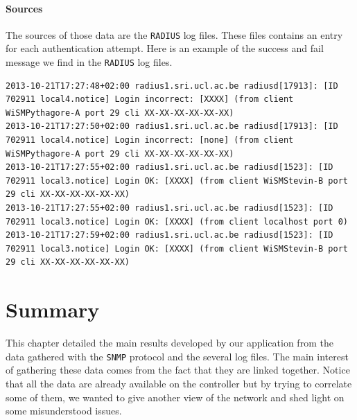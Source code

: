 \paragraph*{Sources} The sources of those data are the \texttt{RADIUS} log files. These files contains an entry for each authentication attempt. Here is an example of the success and fail message we find in the \texttt{RADIUS} log files.
\begin{lstlisting}[frame=single,breaklines=true,caption={\texttt{RADIUS} logs}]
2013-10-21T17:27:48+02:00 radius1.sri.ucl.ac.be radiusd[17913]: [ID 702911 local4.notice] Login incorrect: [XXXX] (from client WiSMPythagore-A port 29 cli XX-XX-XX-XX-XX-XX)
2013-10-21T17:27:50+02:00 radius1.sri.ucl.ac.be radiusd[17913]: [ID 702911 local4.notice] Login incorrect: [none] (from client WiSMPythagore-A port 29 cli XX-XX-XX-XX-XX-XX)
2013-10-21T17:27:55+02:00 radius1.sri.ucl.ac.be radiusd[1523]: [ID 702911 local3.notice] Login OK: [XXXX] (from client WiSMStevin-B port 29 cli XX-XX-XX-XX-XX-XX)
2013-10-21T17:27:55+02:00 radius1.sri.ucl.ac.be radiusd[1523]: [ID 702911 local3.notice] Login OK: [XXXX] (from client localhost port 0)
2013-10-21T17:27:59+02:00 radius1.sri.ucl.ac.be radiusd[1523]: [ID 702911 local3.notice] Login OK: [XXXX] (from client WiSMStevin-B port 29 cli XX-XX-XX-XX-XX-XX)
\end{lstlisting}

\section{Summary}
This chapter detailed the main results developed by our application from the data gathered with the \texttt{SNMP} protocol and the several log files. The main interest of gathering these data comes from the fact that they are linked together. Notice that all the data are already available on the controller but by trying to correlate some of them, we wanted to give another view of the network and shed light on some misunderstood issues. 


